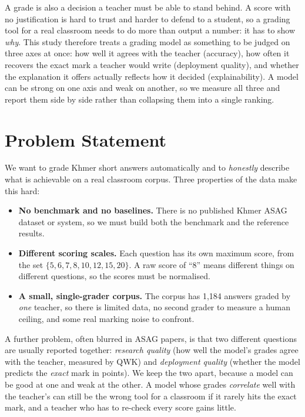 A grade is also a decision a teacher must be able to stand behind. A score with no justification is
hard to trust and harder to defend to a student, so a grading tool for a real classroom needs to do
more than output a number: it has to show \emph{why}. This study therefore treats a grading model as
something to be judged on three axes at once: how well it agrees with the teacher (accuracy), how often
it recovers the exact mark a teacher would write (deployment quality), and whether the explanation it
offers actually reflects how it decided (explainability). A model can be strong on one axis and weak on
another, so we measure all three and report them side by side rather than collapsing them into a single
ranking.

\section{Problem Statement}
We want to grade Khmer short answers automatically and to \emph{honestly} describe what is achievable
on a real classroom corpus. Three properties of the data make this hard:

\begin{itemize}[leftmargin=1.4em]
  \item \textbf{No benchmark and no baselines.} There is no published Khmer ASAG dataset or system, so
  we must build both the benchmark and the reference results.
  \item \textbf{Different scoring scales.} Each question has its own maximum score, from the set
  $\{5,6,7,8,10,12,15,20\}$. A raw score of ``8'' means different things on different questions, so the
  scores must be normalised.
  \item \textbf{A small, single-grader corpus.} The corpus has 1{,}184 answers graded by \emph{one}
  teacher, so there is limited data, no second grader to measure a human ceiling, and some real
  marking noise to confront.
\end{itemize}

A further problem, often blurred in ASAG papers, is that two different questions are usually reported
together: \emph{research quality} (how well the model's grades agree with the teacher, measured by
QWK) and \emph{deployment quality} (whether the model predicts the \emph{exact} mark in points). We
keep the two apart, because a model can be good at one and weak at the other. A model whose grades
\emph{correlate} well with the teacher's can still be the wrong tool for a classroom if it rarely hits
the exact mark, and a teacher who has to re-check every score gains little.


